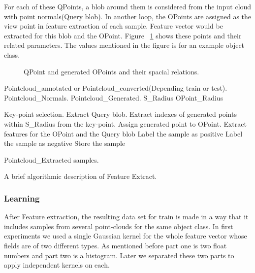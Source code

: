 For each of these QPoints, a blob around them is considered from the input cloud with point normals(Query blob).
In another loop, the OPoints are assigned  as the view point in feature extraction of each sample. 
Feature vector would be extracted for this blob and the OPoint. 
Figure ~\ref{PointParameters_Diagram.figure} shows these points and their related parameters. 
The values mentioned in the figure is for an example object class.

\begin{figure}[t]
  \caption[Feature extract structure]
  {QPoint and generated OPoints and their spacial relations.}
  \label{PointParameters_Diagram.figure}
\end{figure}

\begin{algorithm}[t]
\begin{algorithmic}[1]
\REQUIRE Pointcloud\_annotated or Pointcloud\_converted(Depending train or test).
\REQUIRE Pointcloud\_Normals.
\REQUIRE Pointcloud\_Generated.
\REQUIRE S\_Radius
\REQUIRE OPoint\_Radius
\medskip

\STATE Key-point selection.
  \STATE Extract Query blob.
  \STATE Extract indexes of generated points within S\_Radius from the key-point.
    \STATE Assign generated point to OPoint.
    \STATE Extract features for the OPoint and the Query blob
	\STATE Label the sample as positive
      \ELSE
	\STATE Label the sample as negative
      \ENDIF
     \ENDIF
   \ENDFOR
     \STATE Store the sample
\ENDFOR

\medskip
\ENSURE Pointcloud\_Extracted samples.
\end{algorithmic}
\caption[Feature Extract.]
{A brief algorithmic description of Feature Extract.}
\label{FeatureEXtract.algorithm}
\end{algorithm}

\subsubsection{Learning}
\label{Learning.ssec}

After Feature extraction, the resulting data set for train is made in a way that it includes samples from several point-clouds 
for the same object class. 
In first experiments we used a single Gaussian kernel for the whole feature vector whose fields are of two different types. 
As mentioned before part one is two float numbers and part two is a histogram. 
Later we separated these two parts to apply independent kernels on each. 

